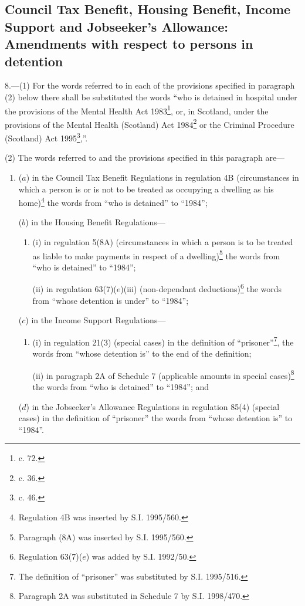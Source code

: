 \documentclass[12pt,a4paper]{article}
\begin{document}
\subsection[8. Council Tax Benefit, Housing Benefit, Income Support and Jobseeker’s Allowance: Amendments with respect to persons in detention]{Council Tax Benefit, Housing Benefit, Income Support and Jobseeker’s Allowance: Amendments with respect to persons in detention}

8.---(1)  For the words referred to in each of the provisions specified in paragraph (2) below there shall be substituted the words “who is detained in hospital under the provisions of the Mental Health Act 1983\footnote{ c. 72.}, or, in Scotland, under the provisions of the Mental Health (Scotland) Act 1984\footnote{ c. 36.} or the Criminal Procedure (Scotland) Act 1995\footnote{ c. 46.},”.

(2) The words referred to and the provisions specified in this paragraph are—
\begin{enumerate}\item[]
($a$) in the Council Tax Benefit Regulations in regulation 4B (circumstances in which a person is or is not to be treated as occupying a dwelling as his home)\footnote{\frenchspacing Regulation 4B was inserted by S.I. 1995/560.} the words from “who is detained” to “1984”;

\enlargethispage{\baselineskip}

($b$) in the Housing Benefit Regulations—
\begin{enumerate}\item[]
(i) in regulation 5(8A) (circumstances in which a person is to be treated as liable to make payments in respect of a dwelling)\footnote{\frenchspacing Paragraph (8A) was inserted by S.I. 1995/560.} the words from “who is detained” to “1984”;

(ii) in regulation 63(7)($e$)(iii)  (non-dependant deductions)\footnote{\frenchspacing Regulation 63(7)($e$) was added by S.I. 1992/50.} the words from “whose detention is under” to “1984”;
\end{enumerate}

($c$) in the Income Support Regulations—
\begin{enumerate}\item[]
(i) in regulation 21(3) (special cases) in the definition of “prisoner”\footnote{\frenchspacing The definition of “prisoner” was substituted by S.I. 1995/516.}, the words from “whose detention is” to the end of the definition;

(ii) in paragraph 2A of Schedule 7 (applicable amounts in special cases)\footnote{\frenchspacing Paragraph 2A was substituted in Schedule 7 by S.I. 1998/470.} the words from “who is detained” to “1984”; and
\end{enumerate}

($d$) in the Jobseeker’s Allowance Regulations in regulation 85(4) (special cases) in the definition of “prisoner” the words from “whose detention is” to “1984”.
\end{enumerate}
\end{document}
